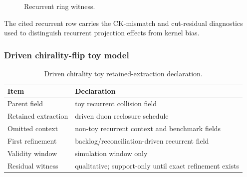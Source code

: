 \begin{figure}[H]
\centering
{}
\caption{Recurrent ring witness.}
\label{fig:recurrent-ring-witness}
\end{figure}

The cited recurrent row carries the CK-mismatch and cut-residual diagnostics used to distinguish recurrent projection effects from kernel bias.


\subsubsection{Driven chirality-flip toy model}
\label{man:driven-chirality-flip-toy}

\begin{table}[H]
\centering
\caption{Driven chirality toy retained-extraction declaration.}
\label{tab:chirality-toy-retention}
\begin{threeparttable}
\begin{tabularx}{\linewidth}{@{}lX@{}}
\toprule
Item & Declaration \\
\midrule
Parent field & toy recurrent collision field \\
Retained extraction & driven duon reclosure schedule \\
Omitted context & non-toy recurrent context and benchmark fields \\
First refinement & backlog/reconciliation-driven recurrent field \\
Validity window & simulation window only \\
Residual witness & qualitative; support-only until exact refinement exists \\
\bottomrule
\end{tabularx}
\end{threeparttable}
\end{table}

